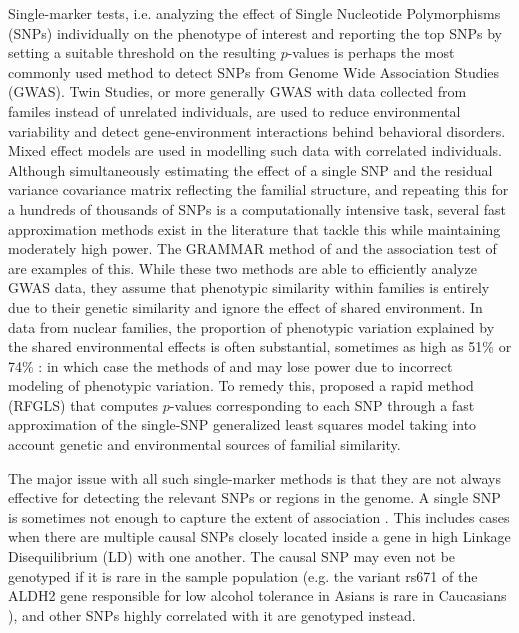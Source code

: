 Single-marker tests, i.e. analyzing the effect of Single Nucleotide Polymorphisms (SNPs) individually on the phenotype of interest and reporting the top SNPs by setting a suitable threshold on the resulting $p$-values is perhaps the most commonly used method to detect SNPs from Genome Wide Association Studies (GWAS). Twin Studies, or more generally GWAS with data collected from familes instead of unrelated individuals, are used to reduce environmental variability and detect gene-environment interactions behind behavioral disorders. Mixed effect models are used in modelling such data with correlated individuals. Although simultaneously estimating the effect of a single SNP and the residual variance covariance matrix reflecting the familial structure, and repeating this for a hundreds of thousands of SNPs is a computationally intensive task, several fast approximation methods exist in the literature that tackle this while maintaining moderately high power. The GRAMMAR method of \cite{AulchenkoEtal07} and the association test of \cite{ChenAbecasis07} are examples of this. While these two methods are able to efficiently analyze GWAS data, they assume that phenotypic similarity within families is entirely due to their genetic similarity and ignore the effect of shared environment. In data from nuclear families, the proportion of phenotypic variation explained by the shared environmental effects is often substantial, sometimes as high as 51\% \citep{McGueEtal13} or 74\% \citep{DeNeveEtal13}: in which case the methods of \cite{AulchenkoEtal07} and \cite{ChenAbecasis07} may lose power due to incorrect modeling of phenotypic variation. To remedy this, \cite{LiEtal11} proposed a rapid method (RFGLS) that computes $p$-values corresponding to each SNP through a fast approximation of the single-SNP generalized least squares model taking into account genetic and environmental sources of familial similarity.

The major issue with all such single-marker methods is that they are not always effective for detecting the relevant SNPs or regions in the genome. A single SNP is sometimes not enough to capture the extent of association \citep{YangEtal12, Ke12}. This includes cases when there are multiple causal SNPs closely located inside a gene in high Linkage Disequilibrium (LD) with one another. The causal SNP may even not be genotyped if it is rare in the sample population (e.g. the variant rs671 of the ALDH2 gene responsible for low alcohol tolerance in Asians is rare in Caucasians \citep{YoshidaEtal84}), and other SNPs highly correlated with it are genotyped instead.


